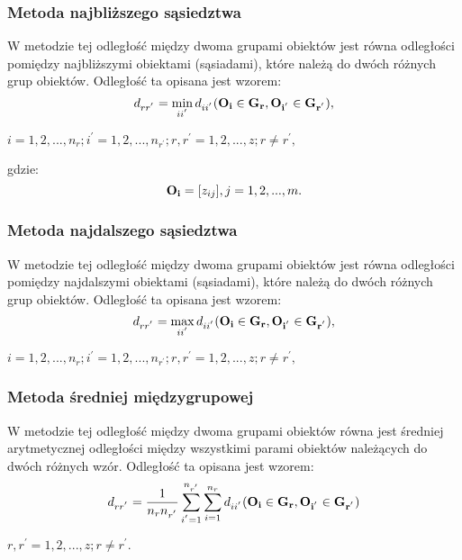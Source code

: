 \documentclass[12pt,a4paper]{report}
\begin{document}
\subsubsection{Metoda najbliższego sąsiedztwa}
\noindent

W metodzie tej odległość między dwoma grupami obiektów jest równa odległości pomiędzy najbliższymi obiektami (sąsiadami), które należą do dwóch różnych grup obiektów. Odległość ta opisana jest wzorem:
\begin{equation}
d_{rr^{'}}= \min\limits_{ii^{'}} {d_{ii^{'}}(\bf{O_i} \in G_{r}, O_{i^{'}} \in G_{r^{'}})},
\end{equation}
\begin{center}
$i=1,2,...,n_{r}; i^{'}=1,2,...,n_{r^{'}}; r,r^{'}=1,2,...,z; r \neq r^{'}, $
\end{center}
gdzie:\\
\begin{equation}
\bold{O_{i}}=[z_{ij}], j=1,2,...,m.
\end{equation}

\subsubsection{Metoda najdalszego sąsiedztwa}
\noindent

W metodzie tej odległość między dwoma grupami obiektów jest równa odległości pomiędzy najdalszymi obiektami (sąsiadami), które należą do dwóch różnych grup obiektów. Odległość ta opisana jest wzorem: 
\begin{equation}
d_{rr^{'}}= \max\limits_{ii^{'}} {d_{ii^{'}}(\bf{O_i} \in G_{r}, O_{i^{'}} \in G_{r^{'}})},
\end{equation}
\begin{center}
$i=1,2,...,n_{r}; i^{'}=1,2,...,n_{r^{'}}; r,r^{'}=1,2,...,z; r \neq r^{'}, $
\end{center}

\subsubsection{Metoda średniej międzygrupowej}
\noindent

W metodzie tej odległość między dwoma grupami obiektów równa jest średniej arytmetycznej odległości między wszystkimi parami obiektów należących do dwóch różnych wzór. Odległość ta opisana jest wzorem: 
\begin{equation}
d_{rr^{'}}=\frac{1}{n_{r}n_{r^{'}}}\sum_{i^{'}=1}^{n_{r^{'}}}\sum_{i=1}^{n_{r}} d_{ii^{'}}(\bf{O_i} \in G_{r}, O_{i^{'}} \in G_{r^{'}})
\end{equation}
\begin{center}
$r,r^{'}=1,2,...,z; r \neq r^{'}. $
\end{center}
\end{document}
